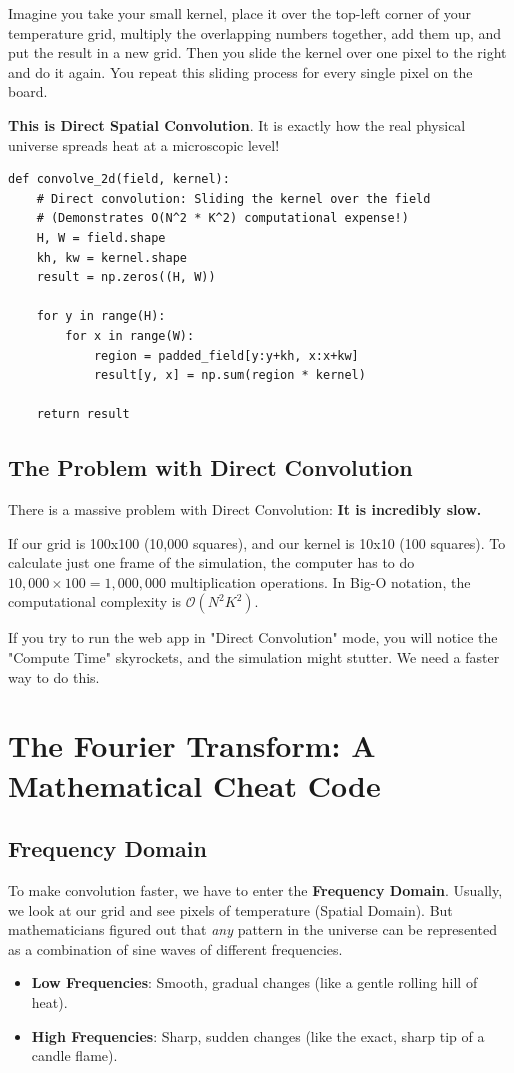 \documentclass[11pt]{book}
\begin{document}
Imagine you take your small kernel, place it over the top-left corner of your temperature grid, multiply the overlapping numbers together, add them up, and put the result in a new grid. Then you slide the kernel over one pixel to the right and do it again. You repeat this sliding process for every single pixel on the board.

\textbf{This is Direct Spatial Convolution}. It is exactly how the real physical universe spreads heat at a microscopic level!

\begin{minipage}{\linewidth}
\begin{lstlisting}
def convolve_2d(field, kernel):
    # Direct convolution: Sliding the kernel over the field
    # (Demonstrates O(N^2 * K^2) computational expense!)
    H, W = field.shape
    kh, kw = kernel.shape
    result = np.zeros((H, W))
    
    for y in range(H):
        for x in range(W):
            region = padded_field[y:y+kh, x:x+kw]
            result[y, x] = np.sum(region * kernel)
            
    return result
\end{lstlisting}
\end{minipage}

\section{The Problem with Direct Convolution}
There is a massive problem with Direct Convolution: \textbf{It is incredibly slow.}

If our grid is 100x100 (10,000 squares), and our kernel is 10x10 (100 squares). To calculate just one frame of the simulation, the computer has to do $10,000 \times 100 = 1,000,000$ multiplication operations. In Big-O notation, the computational complexity is $\mathcal{O}(N^2 K^2)$. 

If you try to run the web app in "Direct Convolution" mode, you will notice the "Compute Time" skyrockets, and the simulation might stutter. We need a faster way to do this.

\chapter{The Fourier Transform: A Mathematical Cheat Code}
\section{Frequency Domain}
To make convolution faster, we have to enter the \textbf{Frequency Domain}. 
Usually, we look at our grid and see pixels of temperature (Spatial Domain). But mathematicians figured out that \textit{any} pattern in the universe can be represented as a combination of sine waves of different frequencies. 
\begin{itemize}
    \item \textbf{Low Frequencies}: Smooth, gradual changes (like a gentle rolling hill of heat).
    \item \textbf{High Frequencies}: Sharp, sudden changes (like the exact, sharp tip of a candle flame).
\end{itemize}
\end{document}
